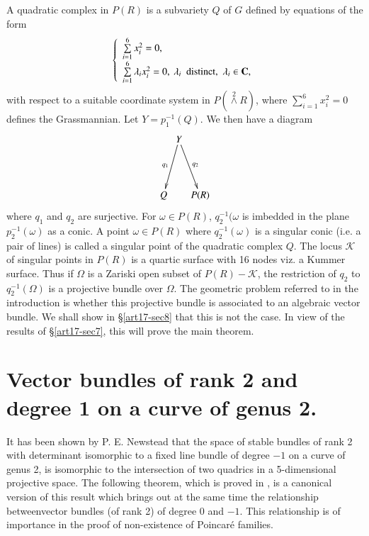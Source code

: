 A quadratic complex in $P(R)$ is a subvariety $Q$ of $G$ defined by equations of the form
$$
\left\{
\begin{array}{l}
\sum\limits^{6}_{i=1}x^{2}_{i}=0,\\[5pt]
\sum\limits^{6}_{i=1}\lambda_{i}x^{2}_{i}=0, \ \lambda_{i}\text{~ distinct,~ } \lambda_{i}\in \mathbf{C},
\end{array}\right.
$$
with respect to a suitable coordinate system in $P({\displaystyle{\mathop{\wedge}\limits^{2}}}R)$, where $\sum\limits^{6}_{i=1}x^{2}_{i}=0$ defines the Grassmannian. Let $Y=p^{-1}_{1}(Q)$. We then have a diagram
\[
\xymatrix@C=.1cm@R=1.5cm{
 & Y\ar[dl]_-{q_{1}}\ar[dr]^-{q_{2}} &\\
Q & & P(R)
}
\]
where $q_{1}$ and $q_{2}$ are surjective. For $\omega \in P(R)$, $q^{-1}_{2}(\omega$ is imbedded in the plane $p^{-1}_{2}(\omega)$ as a conic. A point $\omega\in P(R)$ where $q^{-1}_{2}(\omega)$ is a singular conic (i.e. a pair of lines) is called a singular point of the quadratic complex $Q$. The locus $\mathscr{K}$ of singular points in $P(R)$ is a quartic surface with 16 nodes viz. a Kummer surface. Thus if $\Omega$ is a Zariski open subset of $P(R)-\mathscr{K}$, the restriction of $q_{2}$ to $q^{-1}_{2}(\Omega)$ is a projective bundle over $\Omega$. The geometric problem referred to in the introduction is whether this projective bundle is associated to an algebraic vector bundle. We shall show in \S\ref{art17-sec8} that this is not the case. In view of the results of \S\ref{art17-sec7}, this will prove the main theorem.

\section{Vector bundles of rank 2 and degree 1 on a curve of genus 2.}\label{art17-sec6}

It has been shown by P. E. Newstead \cite{art17-key6} that the space of stable bundles of rank 2 with determinant isomorphic to a fixed line bundle of degree $-1$ on a curve of genus 2, is isomorphic to the intersection of two quadrics in a 5-dimensional projective space. The following theorem, which is proved in \cite{art17-key3}, is a canonical version of this result which brings out at the same time the relationship between\pageoriginale vector bundles (of rank 2) of degree $0$ and $-1$. This relationship is of importance in the proof of non-existence of Poincar\'e families.

